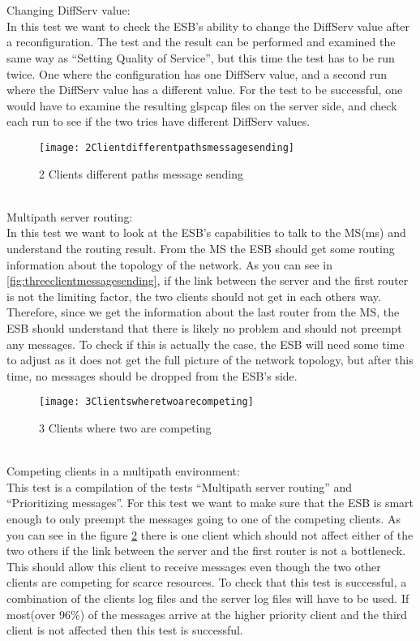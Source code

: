 \\\\
Changing DiffServ value:\\
    In this test we want to check the ESB’s ability to change the DiffServ value after a reconfiguration. The test and the result can be performed and examined the same way as “Setting Quality of Service”, but this time the test has to be run twice. One where the configuration has one DiffServ value, and a second run where the DiffServ value has a different value. For the test to be successful, one would have to examine the resulting gls{pcap} files on the server side, and check each run to see if the two tries have different DiffServ values.
\\
    \begin{figure}[h]
        \centering
        \texttt{[image: 2Clientdifferentpathsmessagesending]}
        \caption{2 Clients different paths message sending}
        \label{fig:2 Clients different paths message sending}
    \end{figure}
\\    
Multipath server routing:\\
    In this test we want to look at the ESB’s capabilities to talk to the MS(\gls{ms}) and understand the routing result. From the MS the ESB should get some routing information about the topology of the network. As you can see in \ref{fig:threeclientmessagesending}, if the link between the server and the first router is not the limiting factor, the two clients should not get in each others way. Therefore, since we get the information about the last router from the MS, the ESB should understand that there is likely no problem and should not preempt any messages. To check if this is actually the case, the ESB will need some time to adjust as it does not get the full picture of the network topology, but after this time, no messages should be dropped from the ESB’s side.
\\
    \begin{figure}[h]
        \centering
        \texttt{[image: 3Clientswheretwoarecompeting]}
        \caption{3 Clients where two are competing}
        \label{fig:3clientstwocompeting}
    \end{figure}
\\
Competing clients in a multipath environment:\\
    This test is a compilation of the tests “Multipath server routing” and “Prioritizing messages”. For this test we want to make sure that the ESB is smart enough to only preempt the messages going to one of the competing clients. As you can see in the figure \ref{fig:3clientstwocompeting} there is one client which should not affect either of the two others if the link between the server and the first router is not a bottleneck. This should allow this client to receive messages even though the two other clients are competing for scarce resources. To check that this test is successful, a combination of the clients log files and the server log files will have to be used. If most(over 96\%) of the messages arrive at the higher priority client and the third client is not affected then this test is successful.
